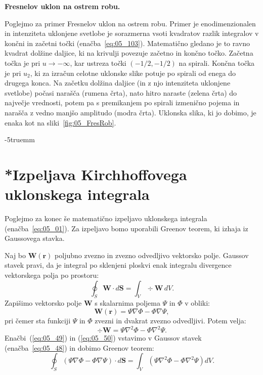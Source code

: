 \begin{example}{\bf Fresnelov uklon na ostrem robu.}
\begin{remark}
Poglejmo za primer Fresnelov uklon na ostrem robu. Primer je enodimenzionalen in 
intenziteta uklonjene svetlobe je sorazmerna vsoti
kvadratov razlik integralov v končni in začetni točki (enačba~\ref{eq:05_103}). Matematično
gledano je to ravno kvadrat dolžine daljice, ki na krivulji povezuje začetno in končno točko.
Začetna točka je pri $u \to -\infty$, kar ustreza točki $(-1/2, -1/2)$ na spirali. 
Končna točka je pri $u_2$, ki za izračun celotne uklonske slike potuje po spirali
od enega do drugega konca. Na začetku dolžina daljice (in z njo intenziteta uklonjene
svetlobe) počasi narašča (rumena črta), nato hitro naraste (zelena črta) do 
največje vrednosti, potem pa s premikanjem po spirali izmenično pojema in narašča
z vedno manjšo amplitudo (modra črta). Uklonska slika, ki jo dobimo, je enaka 
kot na sliki~\ref{fig:05_FresRob}. 
\end{remark}
\vglue-5truemm

\end{example}

\section{*Izpeljava Kirchhoffovega uklonskega integrala}
\label{chap:Kirchhoff}
Poglejmo za konec še matematično izpeljavo uklonskega integrala 
(enačba~\ref{eq:05_01}). 
Za izpeljavo bomo uporabili Greenov teorem, ki izhaja iz Gaussovega stavka. 

Naj bo $\mathbf{W}(\mathbf{r})$ poljubno zvezno in zvezno odvedljivo vektorsko
polje. Gaussov stavek pravi, da je integral po sklenjeni ploskvi enak
integralu divergence vektorskega polja po prostoru:
\begin{equation}
\oint_S \mathbf{W} \cdot d\mathbf{S} = \int_V \div\mathbf{W}\,dV.
\label{eq:05_48}
\end{equation}
Zapišimo  vektorsko polje $\mathbf{W}$ s skalarnima poljema $\Psi$ in $\Phi$
v obliki:
\begin{equation}
\mathbf{W}(\mathbf{r}) = \Psi \nabla \Phi - \Phi \nabla \Psi,
\label{eq:05_49}
\end{equation}
pri čemer sta funkciji $\Psi$ in $\Phi$ zvezni in dvakrat zvezno odvedljivi.
Potem velja:
\begin{equation}
\div \mathbf{W}= \Psi \nabla^2 \Phi - \Phi \nabla^2 \Psi. 
\label{eq:05_50}
\end{equation}
Enačbi~(\ref{eq:05_49}) in (\ref{eq:05_50}) vstavimo v Gaussov stavek 
(enačba~\ref{eq:05_48}) in dobimo Greenov teorem:
\begin{equation}
\oint_S \left(\Psi \nabla \Phi - \Phi \nabla \Psi\right) \cdot d\mathbf{S}  =
\int_V \left( \Psi \nabla^2 \Phi - \Phi \nabla^2 \Psi \right) dV.
\label{eq:05_51}
\end{equation}

